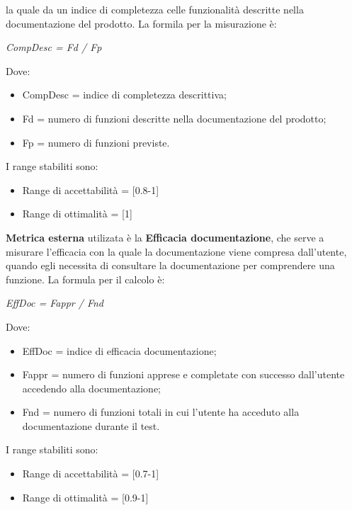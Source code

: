 \begin{itemize}
      la quale da un indice di completezza celle funzionalità descritte nella documentazione del prodotto.
      La formila per la misurazione è:
      \begin{center}
        \emph{CompDesc = Fd / Fp}
      \end{center}
      Dove:
      \begin{itemize}
        \item CompDesc = indice di completezza descrittiva;
        \item Fd = numero di funzioni descritte nella documentazione del prodotto;
        \item Fp = numero di funzioni previste.
      \end{itemize}
      I range stabiliti sono:
      \begin{itemize}
        \item Range di accettabilità = [0.8-1]
        \item Range di ottimalità = [1]
      \end{itemize}
      \textbf{Metrica esterna} utilizata è la \textbf{Efficacia documentazione}, che serve a misurare l'efficacia con la quale la documentazione viene compresa dall'utente,
      quando egli necessita di consultare la documentazione per comprendere una funzione.
      La formula per il calcolo è:
      \begin{center}
        \emph{EffDoc = Fappr / Fnd}
      \end{center}
      Dove:
      \begin{itemize}
        \item EffDoc = indice di efficacia documentazione;
        \item Fappr = numero di funzioni apprese e completate con successo dall'utente accedendo alla documentazione;
        \item Fnd = numero di funzioni totali in cui l'utente ha acceduto alla documentazione durante il test.
      \end{itemize}
      I range stabiliti sono:
      \begin{itemize}
        \item Range di accettabilità = [0.7-1]
        \item Range di ottimalità = [0.9-1]
      \end{itemize}

    \end{itemize}






